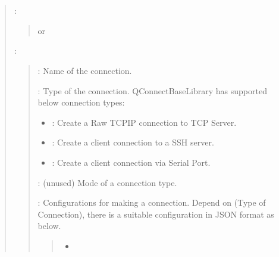 \documentclass[letterpaper,10pt,english]{sphinxmanual}
\begin{document}
\section{}
\label{\detokenize{index:connect}}\begin{quote}

\sphinxAtStartPar
{}

\sphinxAtStartPar
{}:
\begin{quote}

\sphinxAtStartPar
{} 

\sphinxAtStartPar
or

\sphinxAtStartPar
{}
\end{quote}

\sphinxAtStartPar
{}:
\begin{quote}

\sphinxAtStartPar
{}: Name of the connection.

\sphinxAtStartPar
{}: Type of the connection. QConnectBaseLibrary has supported below connection types:
\begin{itemize}
\item {} 
\sphinxAtStartPar
{}: Create a Raw TCPIP connection to TCP Server.

\item {} 
\sphinxAtStartPar
{}: Create a client connection to a SSH server.

\item {} 
\sphinxAtStartPar
{}: Create a client connection via Serial Port.

\end{itemize}

\sphinxAtStartPar
{}: (unused) Mode of a connection type.

\sphinxAtStartPar
{}: Configurations for making a connection. Depend on  (Type of Connection), there is a suitable configuration in JSON format as below.
\begin{quote}
\begin{itemize}
\item {} 
\sphinxAtStartPar
{}


\end{itemize}
\end{quote}
\end{quote}
\end{quote}
\end{document}
